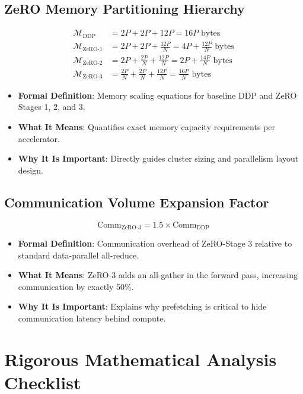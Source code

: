 \documentclass[11pt,a4paper]{article}
\theoremstyle{definition}
\begin{document}
\subsection{ZeRO Memory Partitioning Hierarchy}
{\boldmath
\begin{align}
\mathcal{M}_{\text{DDP}} &= 2P + 2P + 12P = 16P \text{ bytes} \\
\mathcal{M}_{\text{ZeRO-1}} &= 2P + 2P + \frac{12P}{N} = 4P + \frac{12P}{N} \text{ bytes} \\
\mathcal{M}_{\text{ZeRO-2}} &= 2P + \frac{2P}{N} + \frac{12P}{N} = 2P + \frac{14P}{N} \text{ bytes} \\
\mathcal{M}_{\text{ZeRO-3}} &= \frac{2P}{N} + \frac{2P}{N} + \frac{12P}{N} = \frac{16P}{N} \text{ bytes}
\end{align}
}
\begin{itemize}
    \item \textbf{Formal Definition}: Memory scaling equations for baseline DDP and ZeRO Stages 1, 2, and 3.
    \item \textbf{What It Means}: Quantifies exact memory capacity requirements per accelerator.
    \item \textbf{Why It Is Important}: Directly guides cluster sizing and parallelism layout design.
\end{itemize}

\subsection{Communication Volume Expansion Factor}
{\boldmath
\begin{equation}
\text{Comm}_{\text{ZeRO-3}} = 1.5 \times \text{Comm}_{\text{DDP}}
\end{equation}
}
\begin{itemize}
    \item \textbf{Formal Definition}: Communication overhead of ZeRO-Stage 3 relative to standard data-parallel all-reduce.
    \item \textbf{What It Means}: ZeRO-3 adds an all-gather in the forward pass, increasing communication by exactly 50\%.
    \item \textbf{Why It Is Important}: Explains why prefetching is critical to hide communication latency behind compute.
\end{itemize}

\section{Rigorous Mathematical Analysis Checklist}
\end{document}
